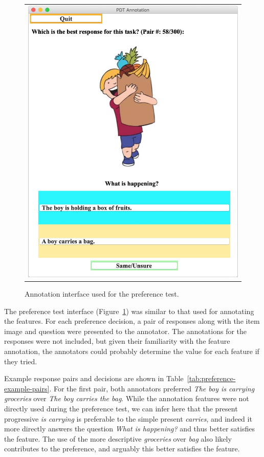 \begin{figure}[htb!]
\begin{center}
\begin{tabular}{c}
\includegraphics[width=0.85\columnwidth]{figures/ab_interface.jpg} \\
\end{tabular}
\caption{\label{fig:preference-interface} Annotation interface used for the preference test.}
\end{center}
\end{figure}

The preference test interface (Figure~\ref{fig:preference-interface}) was similar to that used for annotating the features. For each preference decision, a pair of responses along with the item image and question were presented to the annotator. The annotations for the responses were not included, but given their familiarity with the feature annotation, the annotators could probably determine the value for each feature if they tried.

Example response pairs and decisions are shown in Table~\ref{tab:preference-example-pairs}. For the first pair, both annotators preferred \textit{The boy is carrying groceries} over \textit{The boy carries the bag}. While the annotation features were not directly used during the preference test, we can infer here that the present progressive \textit{is carrying} is preferable to the simple present \textit{carries}, and indeed it more directly answers the question \textit{What is happening?} and thus better satisfies the  feature. The use of the more descriptive \textit{groceries} over \textit{bag} also likely contributes to the preference, and arguably this better satisfies the  feature.

